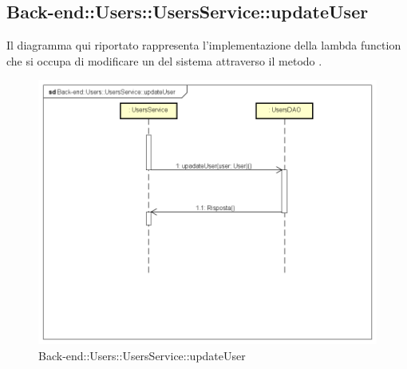 \subsection{Back-end::Users::UsersService::updateUser}
Il diagramma qui riportato rappresenta l'implementazione della lambda function che si occupa di modificare un  del sistema attraverso il metodo .
\begin{figure}[h] \centering \includegraphics[width=\textwidth,height=\textheight,keepaspectratio]{images/diagrams/back-end/Ufficial_Backend/Back-endUsersUsersServiceupdateUser.png} 	\caption{Back-end::Users::UsersService::updateUser}
\end{figure}
\newpage

